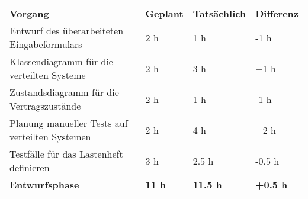 \begin{tabularx}{\textwidth}{Xlll}
\rowcolor{heading}\textbf{Vorgang} & \textbf{Geplant} & \textbf{Tatsächlich} & \textbf{Differenz} \\
Entwurf des überarbeiteten Eingabeformulars & 2 h & 1 h & -1 h \\
\rowcolor{odd}Klassendiagramm für die verteilten Systeme & 2 h & 3 h & +1 h \\
Zustandsdiagramm für die Vertragszustände & 2 h & 1 h & -1 h \\
\rowcolor{odd}Planung manueller Tests auf verteilten Systemen & 2 h & 4 h & +2 h \\
Testfälle für das Lastenheft definieren & 3 h & 2.5 h & -0.5 h \\
\hline
\hline
\rowcolor{heading}\textbf{Entwurfsphase} & \textbf{11 h} & \textbf{11.5 h} & \textbf{+0.5 h} \\
\end{tabularx}
